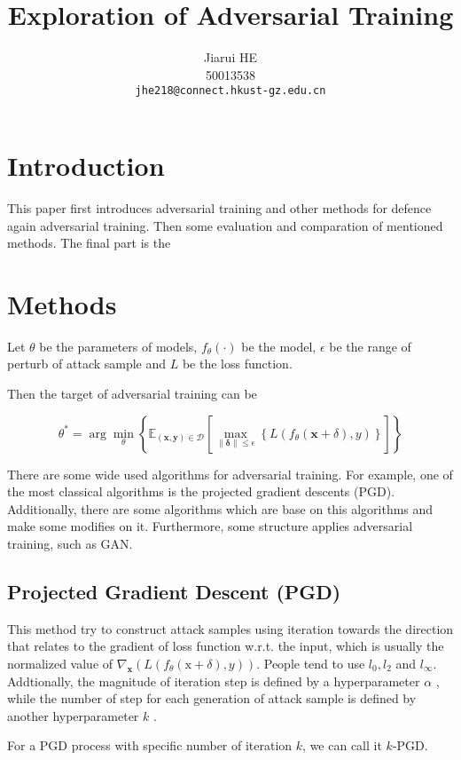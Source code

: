 \documentclass[10pt,twocolumn,letterpaper]{article}
\title{Exploration of Adversarial Training}
\author{Jiarui HE\\
50013538 \\
{\tt\small jhe218@connect.hkust-gz.edu.cn}
}
\begin{document}
\maketitle

\section{Introduction}

This paper first introduces adversarial training and other methods for defence again adversarial training. 
Then some evaluation and comparation of mentioned methods. The final part is the 


\section{Methods}
Let $\theta$ be the parameters of models, $f_\theta(\cdot)$ be the model, $\epsilon$ be the range of perturb of attack sample and $L$ be the loss function.

Then the target of adversarial training can be

$$
\theta^*=\arg\min_\theta\left\{
    \mathbb{E}_{(\mathbf{x}, \mathbf{y})\in \mathcal{D}}
    \left[
        \max_{\lVert\mathbf{\delta}\rVert\leq \epsilon}
            \left\{L(f_\theta(\mathbf{x}+\delta), y)\right\}
    \right]
\right\}
$$

There are some wide used algorithms for adversarial training.
For example, one of the most classical algorithms is the projected gradient descents (PGD).
Additionally, there are some algorithms which are base on this algorithms and make some modifies on it.
Furthermore, some structure applies adversarial training, such as GAN.

\subsection{Projected Gradient Descent (PGD)}

This method try to construct attack samples using iteration towards the direction that relates to the gradient of loss function w.r.t. the input, 
which is usually the normalized value of $\nabla_{\mathbf{x}}(L(f_\theta(\mathrm{x}+\delta), y))$. People tend to use $l_0, l_2$ and $l_{\infty}$. Addtionally, the magnitude of iteration step is defined by a hyperparameter $\alpha$ , while the number of step for each generation of attack sample is defined by another hyperparameter $k$ .

For a PGD process with specific number of iteration $k$, we can call it $k$-PGD.
\end{document}
